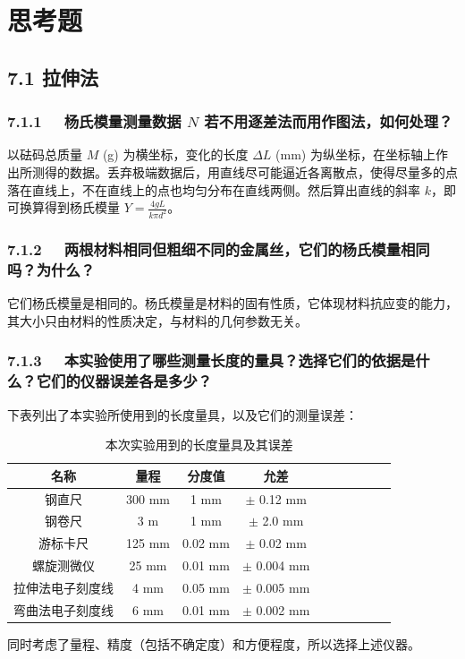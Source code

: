 \documentclass[UTF8]{article}
\theoremstyle{MyLineTheoremStyle} %
\theoremstyle{MyBlockTheoremStyle} %
\theoremstyle{MySubsubsectionStyle} %
\begin{document}
\section{思考题}

\subsection*{7.1 \quad  拉伸法}
\subsubsection*{7.1.1 \ \ 杨氏模量测量数据 $N$ 若不用逐差法而用作图法，如何处理？}
以砝码总质量 $M$ (g) 为横坐标，变化的长度 $\Delta L$ (mm) 为纵坐标，在坐标轴上作出所测得的数据。丢弃极端数据后，用直线尽可能逼近各离散点，使得尽量多的点落在直线上，不在直线上的点也均匀分布在直线两侧。然后算出直线的斜率 $k$，即可换算得到杨氏模量 $Y=\frac{4gL}{k\pi d^2}$。

\subsubsection*{7.1.2 \ \ 两根材料相同但粗细不同的金属丝，它们的杨氏模量相同吗？为什么？}
它们杨氏模量是相同的。杨氏模量是材料的固有性质，它体现材料抗应变的能力，其大小只由材料的性质决定，与材料的几何参数无关。

\subsubsection*{7.1.3 \ \ 本实验使用了哪些测量长度的量具？选择它们的依据是什么？它们的仪器误差各是多少？}
下表列出了本实验所使用到的长度量具，以及它们的测量误差：
\begin{table}[H]\centering
    \caption{本次实验用到的长度量具及其误差}
    \label{本次实验用到的长度量具及其误差}
\begin{tabular}{cccccccccc}\toprule
    名称 & 量程 & 分度值 & 允差  \\
    \midrule
    钢直尺 & 300 mm & 1 mm & $\pm$ 0.12 mm \\
    钢卷尺 & 3 m & 1 mm & $\pm$ 2.0 mm \\
    游标卡尺 & 125 mm & 0.02 mm & $\pm$ 0.02 mm \\
    螺旋测微仪 & 25 mm & 0.01 mm & $\pm$ 0.004 mm \\
    拉伸法电子刻度线 & 4 mm & 0.05 mm & $\pm$ 0.005 mm \\
    弯曲法电子刻度线 & 6 mm & 0.01 mm  & $\pm$ 0.002 mm  \\
    \bottomrule
\end{tabular}
\end{table}
同时考虑了量程、精度（包括不确定度）和方便程度，所以选择上述仪器。
\end{document}
